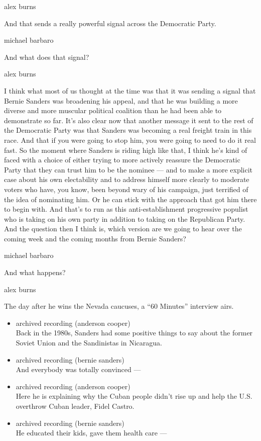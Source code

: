 alex burns

And that sends a really powerful signal across the Democratic Party.

michael barbaro

And what does that signal?

alex burns

I think what most of us thought at the time was that it was sending a
signal that Bernie Sanders was broadening his appeal, and that he was
building a more diverse and more muscular political coalition than he
had been able to demonstrate so far. It's also clear now that another
message it sent to the rest of the Democratic Party was that Sanders was
becoming a real freight train in this race. And that if you were going
to stop him, you were going to need to do it real fast. So the moment
where Sanders is riding high like that, I think he's kind of faced with
a choice of either trying to more actively reassure the Democratic Party
that they can trust him to be the nominee --- and to make a more
explicit case about his own electability and to address himself more
clearly to moderate voters who have, you know, been beyond wary of his
campaign, just terrified of the idea of nominating him. Or he can stick
with the approach that got him there to begin with. And that's to run as
this anti-establishment progressive populist who is taking on his own
party in addition to taking on the Republican Party. And the question
then I think is, which version are we going to hear over the coming week
and the coming months from Bernie Sanders?

michael barbaro

And what happens?

alex burns

The day after he wins the Nevada caucuses, a ``60 Minutes'' interview
airs.

\begin{itemize}
\item
  archived recording (anderson cooper)\\
  Back in the 1980s, Sanders had some positive things to say about the
  former Soviet Union and the Sandinistas in Nicaragua.
\item
  archived recording (bernie sanders)\\
  And everybody was totally convinced ---
\item
  archived recording (anderson cooper)\\
  Here he is explaining why the Cuban people didn't rise up and help the
  U.S. overthrow Cuban leader, Fidel Castro.
\item
  archived recording (bernie sanders)\\
  He educated their kids, gave them health care ---
\end{itemize}

